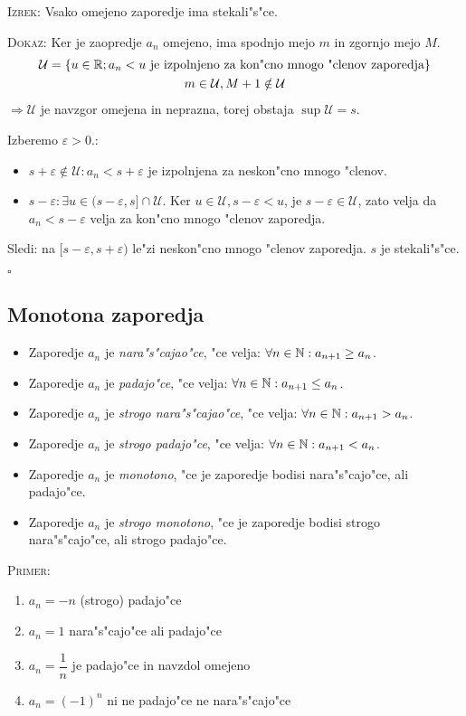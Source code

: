 \textsc{Izrek:} Vsako omejeno zaporedje ima stekali"s"ce.

\textsc{Dokaz:} Ker je zaopredje $a_n$ omejeno, ima spodnjo mejo $m$ in zgornjo mejo $M$.
\begin{gather*}
\mathcal{U} = \{u \in \mathbb{R}; a_n <u \text{ je izpolnjeno za kon"cno mnogo "clenov zaporedja}\}\\
m \in \mathcal{U}, M + 1 \notin \mathcal{U}
\end{gather*}
$\Rightarrow \mathcal{U}$ je navzgor omejena in neprazna, torej obstaja $\sup \mathcal{U} = s$.

Izberemo $\varepsilon > 0$.:
\begin{itemize}
	\item $s + \varepsilon \notin \mathcal{U}: a_n < s + \varepsilon$ je izpolnjena za neskon"cno mnogo "clenov.
	\item $s - \varepsilon: \exists u \in (s-\varepsilon, s] \cap \mathcal{U}$.	Ker $u \in \mathcal{U}, s - \varepsilon < u$, je $s - \varepsilon \in \mathcal{U}$, zato velja da $a_n < s-\varepsilon$ velja za kon"cno mnogo "clenov zaporedja.
\end{itemize}
Sledi: na $[s-\varepsilon, s + \varepsilon)$ le"zi neskon"cno mnogo "clenov zaporedja. $s$ je stekali"s"ce. 

\hfill $\square$

\subsection{Monotona zaporedja}
\begin{itemize}
	\item Zaporedje $a_n$ je \emph{nara"s"cajao"ce}, "ce velja: $\forall n \in \mathbb{N}: a_{n+1} \geq a_n$.
	\item Zaporedje $a_n$ je \emph{padajo"ce}, "ce velja: $\forall n \in \mathbb{N}: a_{n+1} \leq a_n$.
	\item Zaporedje $a_n$ je \emph{strogo nara"s"cajao"ce}, "ce velja: $\forall n \in \mathbb{N}: a_{n+1} > a_n$.
	\item Zaporedje $a_n$ je \emph{strogo padajo"ce}, "ce velja: $\forall n \in \mathbb{N}: a_{n+1} < a_n$.
	\item Zaporedje $a_n$ je \emph{monotono}, "ce je zaporedje bodisi nara"s"cajo"ce, ali padajo"ce.
	\item Zaporedje $a_n$ je \emph{strogo monotono}, "ce je zaporedje bodisi strogo nara"s"cajo"ce, ali strogo padajo"ce.
\end{itemize}

\textsc{Primer:}
\begin{enumerate}[1)]
	\item $a_n = -n$ (strogo) padajo"ce
	\item $a_n = 1$ nara"s"cajo"ce ali padajo"ce
	\item $a_n = \dfrac{1}{n}$ je padajo"ce in navzdol omejeno
	\item $a_n = (-1)^n$ ni ne padajo"ce ne nara"s"cajo"ce
\end{enumerate}

